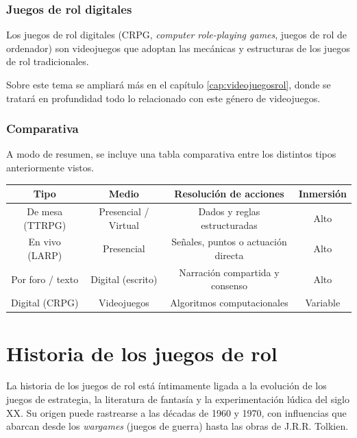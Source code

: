 \subsubsection{Juegos de rol digitales}
Los juegos de rol digitales (CRPG, \textit{computer role-playing games}, juegos de rol de ordenador) son videojuegos que adoptan las mecánicas y estructuras de los juegos de rol tradicionales.

\medskip

Sobre este tema se ampliará más en el capítulo \ref{cap:videojuegosrol}, donde se tratará en profundidad todo lo relacionado con este género de videojuegos.

\subsubsection{Comparativa}
A modo de resumen, se incluye una tabla comparativa entre los distintos tipos anteriormente vistos.
\begin{table}[h]
	\centering
	\footnotesize
	\begin{tabularx}{\textwidth}{@{} c c c c @{}} 
		\toprule
		\textbf{Tipo} & \textbf{Medio} & \textbf{Resolución de acciones} & \textbf{Inmersión} \\
		\midrule
		De mesa (TTRPG) & Presencial / Virtual & Dados y reglas estructuradas & Alto \\
		En vivo (LARP) & Presencial & Señales, puntos o actuación directa & Alto \\
		Por foro / texto & Digital (escrito) & Narración compartida y consenso & Alto \\
		Digital (CRPG) & Videojuegos & Algoritmos computacionales & Variable \\
		\bottomrule
	\end{tabularx}
\end{table}

\section{Historia de los juegos de rol}

La historia de los juegos de rol está íntimamente ligada a la evolución de los juegos de estrategia, la literatura de fantasía y la experimentación lúdica del siglo XX. Su origen puede rastrearse a las décadas de 1960 y 1970, con influencias que abarcan desde los \textit{wargames} (juegos de guerra) hasta las obras de J.R.R. Tolkien.

\medskip


